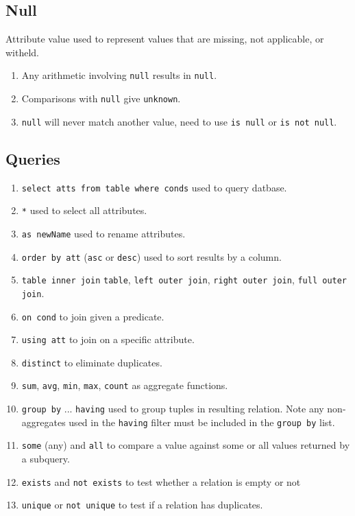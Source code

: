 \documentclass[twocolumn,english]{article}
\begin{document}
\subsection{Null}

Attribute value used to represent values that are missing, not applicable,
or witheld. 
\begin{enumerate}
\item Any arithmetic involving \texttt{null} results in \texttt{null}. 
\item Comparisons with \texttt{null} give \texttt{unknown}. 
\item \texttt{null} will never match another value, need to use \texttt{is
null} or \texttt{is not null}. 
\end{enumerate}

\subsection{Queries}
\begin{enumerate}
\item \texttt{select atts from table where conds} used to query datbase. 
\item \texttt{{*}} used to select all attributes. 
\item \texttt{as newName} used to rename attributes. 
\item \texttt{order by att} (\texttt{asc} or \texttt{desc}) used to sort results by a column. 
\item \texttt{table inner join} \texttt{table}, \texttt{left outer join},
\texttt{right outer join}, \texttt{full outer join}. 
\item \texttt{on cond} to join given a predicate. 
\item \texttt{using att} to join on a specific attribute. 
\item \texttt{distinct} to eliminate duplicates. 
\item \texttt{sum}, \texttt{avg}, \texttt{min}, \texttt{max}, \texttt{count}
as aggregate functions. 
\item \texttt{group by} ... \texttt{having} used to group tuples in resulting
relation. Note any non-aggregates used in the \texttt{having} filter
must be included in the \texttt{group by} list.
\item \texttt{some} (any) and \texttt{all} to compare a value against some
or all values returned by a subquery. 
\item \texttt{exists} and \texttt{not exists} to test whether a relation
is empty or not 
\item \texttt{unique} or \texttt{not unique} to test if a relation has duplicates.
\end{enumerate}
\end{document}
